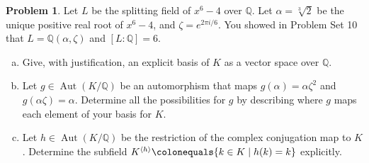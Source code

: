 \documentclass[11pt]{article}
\DeclareMathOperator{\Aut}{Aut}
\newcommand{\Q}{\mathbb{Q}}
\theoremstyle{definition}
\newtheorem{problem}{Problem}
\begin{document}
\begin{problem}
Let $L$ be the splitting field of $x^6-4$ over $\Q$. Let $\alpha = \sqrt[3]{2}$ be the unique positive real root of $x^6-4$, and $\zeta = e^{2\pi i/6}$. You showed in Problem Set 10 that $L=\Q(\alpha,\zeta)$ and $[L:\Q]=6$.

\begin{enumerate}[a)]
\item Give, with justification, an explicit basis of $K$ as a vector space over $\Q$. 

\item Let $g \in \Aut(K/\Q)$ be an automorphism that maps $g(\alpha)= \alpha\zeta^2$ and $g(\alpha\zeta)=\alpha$. Determine all the possibilities for $g$ by describing where $g$ maps each element of your basis for $K$. 

\item Let $h \in \Aut(K/\Q)$ be the restriction of the complex conjugation map to $K$. Determine the subfield $K^{\langle h \rangle} \colonequals \{k\in K \mid h(k)=k\}$ explicitly. 
\end{enumerate}
\end{problem}





%
%
\end{document}
